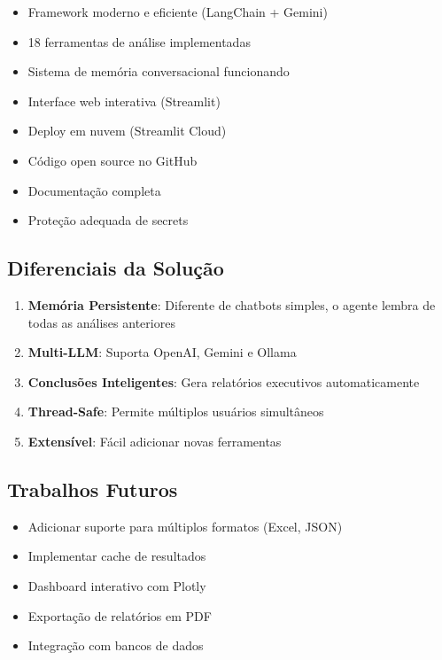 \documentclass[12pt,a4paper]{article}
\begin{document}
\begin{itemize}
    \item[\checkmark] Framework moderno e eficiente (LangChain + Gemini)
    \item[\checkmark] 18 ferramentas de análise implementadas
    \item[\checkmark] Sistema de memória conversacional funcionando
    \item[\checkmark] Interface web interativa (Streamlit)
    \item[\checkmark] Deploy em nuvem (Streamlit Cloud)
    \item[\checkmark] Código open source no GitHub
    \item[\checkmark] Documentação completa
    \item[\checkmark] Proteção adequada de secrets
\end{itemize}

\subsection{Diferenciais da Solução}

\begin{enumerate}
    \item \textbf{Memória Persistente}: Diferente de chatbots simples, o agente lembra de todas as análises anteriores
    \item \textbf{Multi-LLM}: Suporta OpenAI, Gemini e Ollama
    \item \textbf{Conclusões Inteligentes}: Gera relatórios executivos automaticamente
    \item \textbf{Thread-Safe}: Permite múltiplos usuários simultâneos
    \item \textbf{Extensível}: Fácil adicionar novas ferramentas
\end{enumerate}

\subsection{Trabalhos Futuros}

\begin{itemize}
    \item Adicionar suporte para múltiplos formatos (Excel, JSON)
    \item Implementar cache de resultados
    \item Dashboard interativo com Plotly
    \item Exportação de relatórios em PDF
    \item Integração com bancos de dados
\end{itemize}
\end{document}
